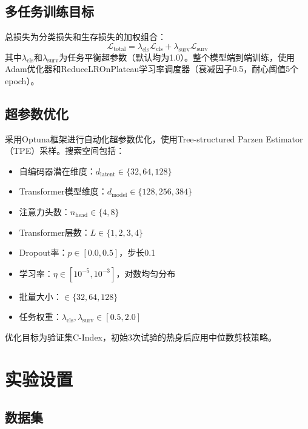 \documentclass[conference]{IEEEtran}
\begin{document}
\subsection{多任务训练目标}

总损失为分类损失和生存损失的加权组合：
\begin{equation}
\mathcal{L}_{\text{total}} = \lambda_{\text{cls}} \mathcal{L}_{\text{cls}} + \lambda_{\text{surv}} \mathcal{L}_{\text{surv}}
\end{equation}
其中$\lambda_{\text{cls}}$和$\lambda_{\text{surv}}$为任务平衡超参数（默认均为1.0）。整个模型端到端训练，使用Adam优化器和ReduceLROnPlateau学习率调度器（衰减因子0.5，耐心阈值5个epoch）。

\subsection{超参数优化}

采用Optuna\cite{akiba2019optuna}框架进行自动化超参数优化，使用Tree-structured Parzen Estimator（TPE）采样。搜索空间包括：
\begin{itemize}
    \item 自编码器潜在维度：$d_{\text{latent}} \in \{32, 64, 128\}$
    \item Transformer模型维度：$d_{\text{model}} \in \{128, 256, 384\}$
    \item 注意力头数：$n_{\text{head}} \in \{4, 8\}$
    \item Transformer层数：$L \in \{1, 2, 3, 4\}$
    \item Dropout率：$p \in [0.0, 0.5]$，步长0.1
    \item 学习率：$\eta \in [10^{-5}, 10^{-3}]$，对数均匀分布
    \item 批量大小：$\in \{32, 64, 128\}$
    \item 任务权重：$\lambda_{\text{cls}}, \lambda_{\text{surv}} \in [0.5, 2.0]$
\end{itemize}
优化目标为验证集C-Index，初始3次试验的热身后应用中位数剪枝策略。

\section{实验设置}
\label{sec:experiments}

\subsection{数据集}
\end{document}
